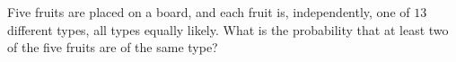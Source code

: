 Five fruits are placed on a board, and each fruit is, independently, one of $13$ different types, all types equally likely. What is the probability that at least two of the five fruits are of the same type?
